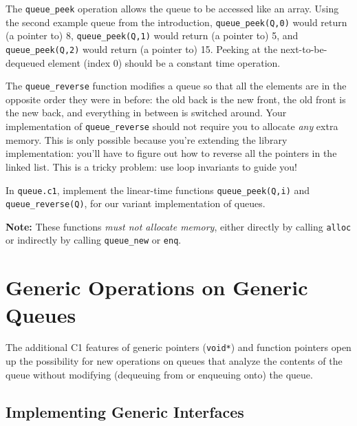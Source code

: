 \documentclass[12pt]{exam}
\begin{document}
The \lstinline'queue_peek' operation allows the queue to be accessed like
an array. Using the second example queue from the introduction,
\lstinline'queue_peek(Q,0)' would return (a pointer to) 8,
\lstinline'queue_peek(Q,1)' would return (a pointer to) 5, and
\lstinline'queue_peek(Q,2)' would return (a pointer to) 15. Peeking at the
next-to-be-dequeued element (index 0) should be a constant time
operation.

The \lstinline'queue_reverse' function modifies a queue so that all
the elements are in the opposite order they were in before: the old
back is the new front, the old front is the new back, and everything
in between is switched around. Your implementation of
\lstinline'queue_reverse' should not require you to allocate
\emph{any} extra memory. This is only possible because you're
extending the library implementation: you'll have to figure out how to
reverse all the pointers in the linked list. This is a tricky problem:
use loop invariants to guide you!

\begin{task}[3]
In \lstinline'queue.c1', implement the linear-time functions
\lstinline'queue_peek(Q,i)' and \lstinline'queue_reverse(Q)', for our variant
implementation of queues.

\textbf{Note:} These functions \emph{must not allocate memory}, either
directly by calling \lstinline'alloc' or indirectly by calling
\lstinline'queue_new' or \lstinline'enq'.
\end{task}

\clearpage
\section{Generic Operations on Generic Queues}

The additional C1 features of generic pointers (\lstinline'void*') and
function pointers open up the possibility for new operations on queues
that analyze the contents of the queue without modifying (dequeuing
from or enqueuing onto) the queue.

\subsection{Implementing Generic Interfaces}
\end{document}
